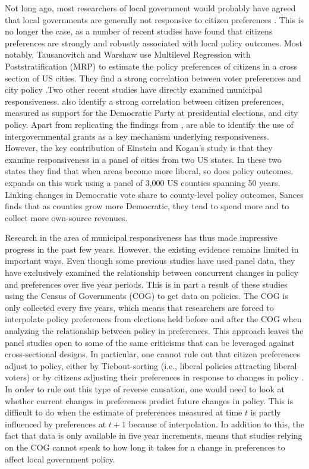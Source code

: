 \documentclass[a4paper,12pt]{article}
\begin{document}
 Not long ago, most researchers of local government would probably have agreed that local governments are generally not responsive to citizen preferences \citep{peterson1981city}. This is no longer the case, as a number of recent studies have found that citizens preferences are strongly and robustly associated with local policy outcomes. Most notably, Tausanovitch and Warshaw use Multilevel Regression with Poststratification (MRP) to estimate the policy preferences of citizens in a cross section of US cities. They find a strong correlation between voter preferences and city policy \citep[for earlier efforts, see ][]{hajnal2010or,palus2010responsiveness}.Two other recent studies have directly examined municipal responsiveness. \cite{einstein2016pushing} also identify a strong correlation between citizen preferences, measured as support for the Democratic Party at presidential elections,  and city policy. Apart from replicating the findings from \citeauthor{tausanovitch2014representation}, \citeauthor{einstein2016pushing} are able to identify the use of intergovernmental grants as a key mechanism underlying responsiveness. However, the key contribution of Einstein and Kogan's study is that they examine responsiveness in a panel of cities from two US states. In these two states they find that when areas become more liberal, so does policy outcomes. \citet{sances2017voters} expands on this work using a panel of 3,000 US counties spanning 50 years. Linking changes in Democratic vote share to county-level policy outcomes, Sances finds that as counties grow more Democratic, they tend to spend more and to collect more own-source revenues.
 
 
Research in the area of municipal responsiveness has thus made impressive progress in the past few years. However, the existing evidence remains limited in important ways. Even though some previous studies have used panel data, they have exclusively examined  the relationship between concurrent changes in policy and preferences over five year periods.  This is in part a result of these studies using the Census of  Governments (COG) to get data on policies. The COG is only collected every five years, which means that researchers are forced to interpolate policy preferences from elections held before and after the COG when analyzing the relationship between policy in preferences. This approach leaves the panel studies open to some of the same criticisms that can be leveraged against cross-sectional designs. In particular, one cannot rule out that citizen preferences adjust to policy, either by Tiebout-sorting (i.e., liberal policies attracting liberal voters) or by citizens adjusting their preferences in response to changes in policy \citep[e.g.,][]{tiebout1956pure,broockman2017causal}. In order to rule out this type of reverse causation, one would need to look at whether current changes in preferences predict future changes in policy. This is difficult to do when the estimate of preferences measured at time $t$ is partly influenced by preferences at $t+1$ because of interpolation. In addition to this, the fact that data is only available in five year increments, means that studies relying on the COG cannot speak to how long it takes for a change in preferences to affect local government policy. 
\end{document}
